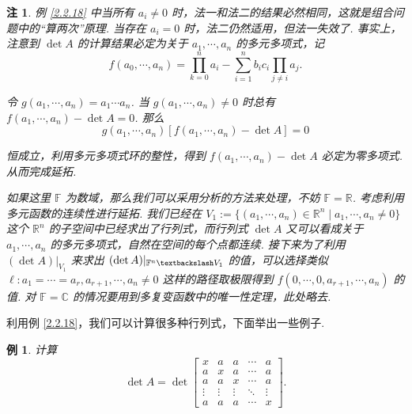 \documentclass[10pt,openany]{article}
\theoremstyle{thmstyle} %
\theoremstyle{defstyle} %
\theoremstyle{prostyle} %
\theoremstyle{exastyle}
\newtheorem{example}[theorem]{例}
\theoremstyle{remstyle}
\newtheorem{remark}[theorem]{注}
\newcommand{\F}{\mathbb{F}}
\newcommand{\C}{\mathbb{C}}
\newcommand{\R}{\mathbb{R}}
\begin{document}
\begin{remark} \label{2.2.19}
	例 \ref{2.2.18} 中当所有 \( a_i \neq 0 \) 时，法一和法二的结果必然相同，这就是组合问题中的“算两次”原理. 当存在 \( a_i =0 \) 时，法二仍然适用，但法一失效了. 事实上，注意到 \( \det A \) 的计算结果必定为关于 \( a_1,\cdots,a_n \) 的多元多项式，记
	\[ f(a_0,\cdots,a_n)=\prod_{k=0}^{n} a_i-\sum_{i=1}^{n} b_ic_i \prod_{j \neq i}^{} a_j. \]
	
	令 \( g(a_1,\cdots,a_n)=a_1\cdots a_n \). 当 \( g(a_1,\cdots,a_n) \neq 0 \) 时总有 \( f(a_1,\cdots,a_n)-\det A=0 \). 那么
	\[ g(a_1,\cdots,a_n)[f(a_1,\cdots,a_n)-\det A]=0 \] 
	
	恒成立，利用多元多项式环的整性，得到 \( f(a_1,\cdots,a_n)-\det A \) 必定为零多项式. 从而完成延拓. 
	
	如果这里 \( \F \) 为数域，那么我们可以采用分析的方法来处理，不妨 \( \F=\R \). 考虑利用多元函数的连续性进行延拓. 我们已经在 \( V_1:=\{ (a_1,\cdots,a_n) \in \R^n \mid a_1,\cdots,a_n \neq 0 \} \) 这个 \( \R^n \) 的子空间中已经求出了行列式，而行列式 \( \det A \) 又可以看成关于 \( a_1,\cdots,a_n \) 的多元多项式，自然在空间的每个点都连续. 接下来为了利用 \( (\det A)|_{V_1} \) 来求出 \( (\det A)|_{\mathbb{F}^n\textbackslash V_1} \) 的值，可以选择类似 \( \ell: a_1=\cdots=a_r, a_{r+1}, \cdots, a_n \neq 0 \) 这样的路径取极限得到 \( f(0,\cdots,0,a_{r+1},\cdots,a_n) \) 的值. 对 \( \F =\C \) 的情况要用到多复变函数中的唯一性定理，此处略去.
\end{remark}

\vspace{1ex}

利用例 \ref{2.2.18}，我们可以计算很多种行列式，下面举出一些例子.

\begin{example}	\label{2.2.20}
	计算 \[
	\det A= \det \begin{bmatrix}
		x & a & a & \cdots & a \\
		a & x & a & \cdots & a \\
		a & a & x & \cdots & a \\
		\vdots & \vdots & \vdots & \ddots & \vdots \\
		a & a & a & \cdots & x
	\end{bmatrix}.
	\]

\end{example}
\end{document}
